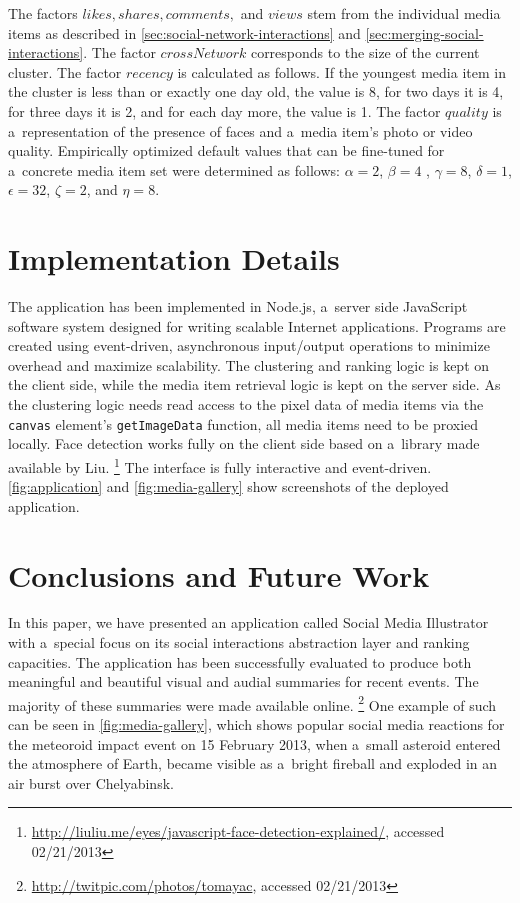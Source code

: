 \documentclass{sig-alternate}
\newcommand{\inlinelistingsize}{\fontsize{8pt}{11pt}}
\let\oldurl\url
\renewcommand{\url}[1]{\inlinelistingsize\oldurl{#1}}
\begin{document}
The factors $ \mathit{likes}, \mathit{shares}, \mathit{comments},$ and $ \mathit{views} $
stem from the individual media items as described in \autoref{sec:social-network-interactions}
and \autoref{sec:merging-social-interactions}.
The factor $ \mathit{crossNetwork} $ corresponds to the size of the current cluster. 
The factor $ \mathit{recency} $ is calculated as follows.
If the youngest media item in the cluster is less than or exactly one day old,
the value is 8, for two days it is 4, for three days it is 2,
and for each day more, the value is 1.
The factor $ \mathit{quality} $ is a~representation of the
presence of faces and a~media item's photo or video quality.
Empirically optimized default values
that can be fine-tuned for a~concrete media item set
were determined as follows:
$ \alpha = 2 $, $ \beta = 4 $ , $ \gamma = 8 $, $ \delta = 1 $,
$ \epsilon = 32 $, $ \zeta = 2 $, and $ \eta = 8 $.

\section{Implementation Details}

The application has been implemented in Node.js,
a~server side JavaScript software system
designed for writing scalable Internet applications.
Programs are created using event-driven, asynchronous input/output operations
to minimize overhead and maximize scalability.
The clustering and ranking logic is kept on the client side,
while the media item retrieval logic is kept on the server side.
As the clustering logic needs read access to the pixel data of media items via
the \texttt{canvas} element's \texttt{getImageData} function,
all media items need to be proxied locally.
Face detection works fully on the client side based on a~library
made available by Liu.%
\footnote{\url{http://liuliu.me/eyes/javascript-face-detection-explained/},
accessed 02/21/2013}
The interface is fully interactive and event-driven.
\autoref{fig:application} and \autoref{fig:media-gallery} show screenshots
of the deployed application.

\section{Conclusions and Future Work}

In this paper, we have presented an application called Social Media Illustrator with
a~special focus on its social interactions abstraction layer and ranking capacities.
The application has been successfully evaluated to produce both meaningful and beautiful
visual and audial summaries for recent events.
The majority of these summaries were made available online.%
\footnote{\url{http://twitpic.com/photos/tomayac}, accessed 02/21/2013}
One example of such can be seen in \autoref{fig:media-gallery},
which shows popular social media reactions for the meteoroid impact event
on 15 February 2013, when a~small asteroid entered the atmosphere of Earth,
became visible as a~bright fireball
and exploded in an air burst over Chelyabinsk.
\end{document}
